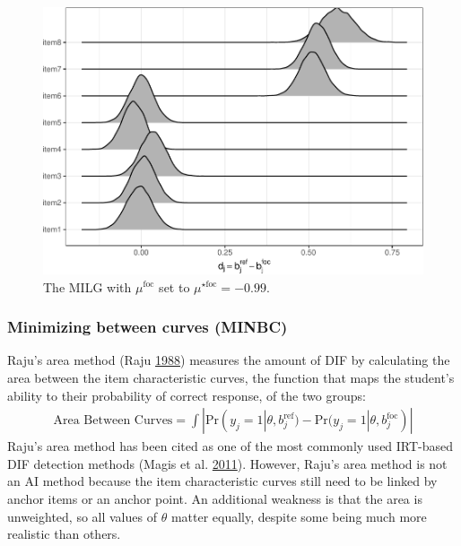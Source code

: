 \documentclass[
  11pt,
]{article}
\begin{document}
\begin{figure}[H]

{\centering \includegraphics[width=0.7\linewidth]{paper_files/figure-latex/ginimilg-1} 

}

\caption{The MILG with $\mu^{\text{foc}}$ set to $\mu^{\star\text{foc}} = -0.99$.}\label{fig:ginimilg}
\end{figure}

\hypertarget{minimizing-between-curves-minbc}{%
\subsubsection{Minimizing between curves (MINBC)}\label{minimizing-between-curves-minbc}}

Raju's area method (Raju \protect\hyperlink{ref-raju1988area}{1988}) measures the amount of DIF by calculating the area between the item characteristic curves, the function that maps the student's ability to their probability of correct response, of the two groups:
\begin{align}
\text{Area Between Curves} = \int |\text{Pr}(y_j = 1| \theta, b_j^{\text{ref}}) - \text{Pr}(y_j = 1| \theta, b_j^{\text{foc}})|
\end{align}
Raju's area method has been cited as one of the most commonly used IRT-based DIF detection methods (Magis et al. \protect\hyperlink{ref-magis2011generalized}{2011}). However, Raju's area method is not an AI method because the item characteristic curves still need to be linked by anchor items or an anchor point. An additional weakness is that the area is unweighted, so all values of \(\theta\) matter equally, despite some being much more realistic than others.
\end{document}
